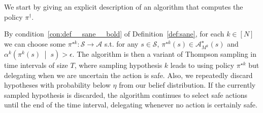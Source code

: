 \documentclass[anon,12pt]{colt2018} %
\newcommand{\APM}[2]{\left(#1\;\middle\vert\;#2\right)}
\newcommand{\A}{\mathcal{A}}
\newcommand{\St}{\mathcal{S}}
\begin{document}
We start by giving an explicit description of an algorithm that computes the policy $\pi^\dagger$.

By condition~\ref{con:def__sane__bold} of Definition~\ref{def:sane}, for each $k\in[N]$ we can choose some $\pi^{\star k}: \St \rightarrow \A$ s.t. for any $s \in \St$, $\pi^{\star k}(s) \in \A_{M^k}^\star(s)$ and $\alpha^k\APM{\pi^k(s)}{s} > \epsilon$. The algorithm is then a variant of Thompson sampling in time intervals of size $T$, where sampling hypothesis $k$ leads to using policy $\pi^{\star k}$ but delegating when we are uncertain the action is safe. Also, we repeatedly discard hypotheses with probability below $\eta$ from our belief distribution. If the currently sampled hypothesis is discarded, the algorithm continues to select safe actions until the end of the time interval, delegating whenever no action is certainly safe.\pagebreak

\LinesNumbered
\DontPrintSemicolon
{}
\end{document}
